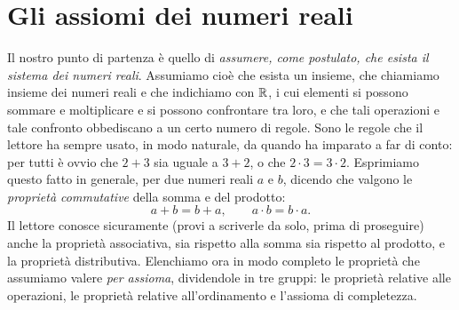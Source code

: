 \section{Gli assiomi dei numeri reali}
\label{sec:assiomi}

Il nostro punto di partenza è quello di \emph{assumere, come postulato, che esista il
sistema dei numeri reali}. Assumiamo cioè che esista un insieme, che chiamiamo insieme
dei numeri reali e che indichiamo con $\mathbb{R}$, i cui elementi si possono sommare e
moltiplicare e si possono confrontare tra loro, e che tali operazioni e tale confronto
obbediscano a un certo numero di regole. Sono le regole che il lettore ha sempre usato,
in modo naturale, da quando ha imparato a far di conto: per tutti è ovvio che $2+3$ sia
uguale a $3+2$, o che $2\cdot3=3\cdot2$. Esprimiamo questo fatto in generale, per due
numeri reali $a$ e $b$, dicendo che valgono le \emph{proprietà commutative} della
somma e del prodotto:
\begin{equation}\label{eq:commutativa}
  a+b=b+a, \qquad a\cdot b=b\cdot a .
\end{equation}
Il lettore conosce sicuramente (provi a scriverle da solo, prima di proseguire) anche
la proprietà associativa, sia rispetto alla somma sia rispetto al prodotto, e la
proprietà distributiva. Elenchiamo ora in modo completo le proprietà che assumiamo
valere \emph{per assioma}, dividendole in tre gruppi: le proprietà relative alle
operazioni, le proprietà relative all'ordinamento e l'assioma di completezza.

